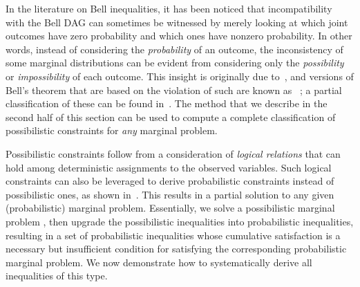 {In the literature on Bell inequalities, it has been noticed that incompatibility with the Bell DAG can sometimes be witnessed by merely looking at which joint outcomes have zero probability and which ones have nonzero probability. In other words, instead of considering the \emph{probability} of an outcome, the inconsistency of some marginal distributions can be evident from considering only the \emph{possibility} or \emph{impossibility} of each outcome. This insight is originally due to~\citet{L.Hardy:PRL:1665}, and versions of Bell's theorem that are based on the violation of such  are known as ~\cite{Garuccio95,CabelloHardyInequality,Braun08,Mancinska14,LSW}; a partial classification of these can be found in~\cite{Mansfield2012}. The method that we describe in the second half of this section can be used to compute a complete classification of possibilistic constraints for \emph{any} marginal problem.

Possibilistic constraints follow from a consideration of {\em logical relations} that can hold among deterministic assignments to the observed variables. Such logical constraints can also be leveraged to derive probabilistic constraints instead of possibilistic ones, as shown in~\cite{Pitowsky1989,Ghirardi08}. This results in a partial solution to any given (probabilistic) marginal problem. Essentially, we solve a possibilistic marginal problem \cite{Mansfield2012}, then upgrade the possibilistic inequalities into probabilistic inequalities, resulting in a set of probabilistic inequalities whose cumulative satisfaction is a necessary but insufficient condition for satisfying the corresponding probabilistic marginal problem. We now demonstrate how to systematically derive all inequalities of this type.


}

